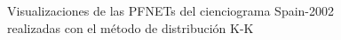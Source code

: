 \documentclass[10pt,a4paper,spanish]{article}
\numberwithin{equation}{section} %
\numberwithin{figure}{section} %
\numberwithin{table}{section} %
\begin{document}
\begin{figure}[!h]
{{            \label{q4kksp}
        }
    }
    \caption{Visualizaciones de las PFNETs del cienciograma Spain-2002 realizadas con el método de distribución K-K}
    \label{kksp}
\end{figure}
\end{document}

